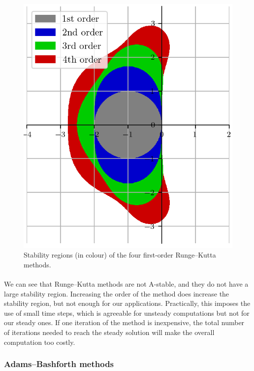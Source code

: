         \begin{figure}
          \centering
          \includegraphics{figures/rk_stab.png}
          \caption{Stability regions (in colour) of the four first-order Runge--Kutta methods.}
          \label{fig:rk_stab}
        \end{figure}

        \paragraph{}
        We can see that Runge--Kutta methods are not A-stable, and they do not have a large stability region.
        Increasing the order of the method does increase the stability region, but not enough for our applications.
        Practically, this imposes the use of small time steps, which is agreeable for unsteady computations but not for our steady ones.
        If one iteration of the method is inexpensive, the total number of iterations needed to reach the steady solution will make the overall computation too costly.


      \subsubsection{Adams--Bashforth methods}

